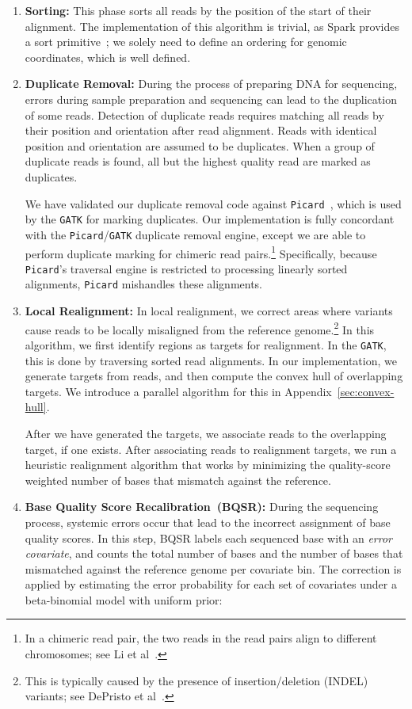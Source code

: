 \documentclass{sig-alternate}
\begin{document}
\begin{enumerate}
\item \textbf{Sorting:} This phase sorts all reads by the position of the start of their alignment. The implementation
of this algorithm is trivial, as Spark provides a sort primitive~\cite{zaharia10}; we solely need to define an
ordering for genomic coordinates, which is well defined.
\item \textbf{Duplicate Removal:} During the process of preparing DNA for sequencing, errors during sample preparation
and sequencing can lead to the duplication of some reads. Detection of duplicate reads requires matching all reads by
their position and orientation after read alignment. Reads with identical position and orientation are assumed to be
duplicates. When a group of duplicate reads is found, all but the highest quality read are marked as duplicates.

We have validated our duplicate removal code against \texttt{Picard}~\cite{picard}, which is used by the \texttt{GATK}
for marking duplicates. Our implementation is fully concordant with the \texttt{Picard}/\texttt{GATK} duplicate removal
engine, except we are able to perform duplicate marking for chimeric read pairs.\footnote{In a chimeric read pair,
the two reads in the read pairs align to different chromosomes; see Li et al~\cite{li10}.}
Specifically, because \texttt{Picard}'s traversal engine is restricted to processing linearly sorted alignments,
\texttt{Picard} mishandles these alignments.
\item \textbf{Local Realignment:} In local realignment, we correct areas where variants cause reads to be
locally misaligned from the reference genome.\footnote{This is typically caused by the presence of
insertion/deletion (INDEL) variants; see DePristo et al~\cite{depristo11}.} In this algorithm, we first identify regions
as targets for realignment. In the \texttt{GATK}, this is done by traversing sorted read alignments. In our implementation,
we generate targets from reads, and then compute the convex hull of overlapping targets. We introduce a parallel
algorithm for this in Appendix~\ref{sec:convex-hull}.

After we have generated the targets, we associate reads to the overlapping target, if one exists. After
associating reads to realignment targets, we run a heuristic realignment algorithm that works by minimizing
the quality-score weighted number of bases that mismatch against the reference.
\item \textbf{Base Quality Score Recalibration~(BQSR):} During the sequencing process, systemic errors occur
that lead to the incorrect assignment of base quality scores. In this step, BQSR labels each sequenced base with an
\emph{error covariate}, and counts the total number of bases and the number of bases that mismatched
against the reference genome per covariate bin. The correction is applied by estimating the error probability
for each set of covariates under a beta-binomial model with uniform prior:


\end{enumerate}
\end{document}
